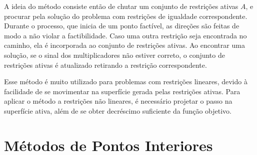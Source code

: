 A ideia do método consiste então de chutar um conjunto de restrições ativas $A$, e
procurar pela solução do problema com restrições de igualdade correspondente.
Durante o processo, que inicia de um ponto factível, as direções são feitas de
modo a não violar a factibilidade. Caso uma outra restrição seja encontrada no
caminho, ela é incorporada ao conjunto de restrições ativas. Ao encontrar uma
solução, se o sinal dos multiplicadores não estiver correto, o conjunto de
restrições ativas é atualizado retirando a restrição correspondente.

Esse método é muito utilizado para problemas com restrições lineares, devido à
facilidade de se movimentar na superfície gerada pelas restrições ativas. Para
aplicar o método a restrições não lineares, é necessário projetar o passo na
superfície ativa, além de se obter decréscimo suficiente da função objetivo.

\section{Métodos de Pontos Interiores}

